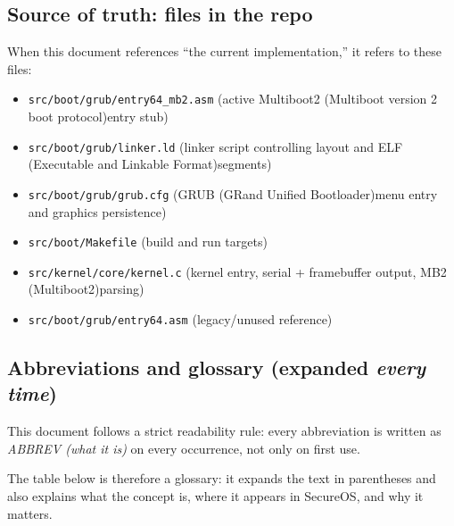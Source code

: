 \documentclass[11pt]{article}
\newcommand{\ELF}{ELF (Executable and Linkable Format)}
\newcommand{\GRUB}{GRUB (GRand Unified Bootloader)}
\newcommand{\MBtwo}{Multiboot2 (Multiboot version 2 boot protocol)}
\newcommand{\MBtwoShort}{MB2 (Multiboot2)}
\begin{document}
\subsection{Source of truth: files in the repo}
When this document references ``the current implementation,'' it refers to these files:
\begin{itemize}
  \item \texttt{src/boot/grub/entry64\_mb2.asm} (active \MBtwo entry stub)
  \item \texttt{src/boot/grub/linker.ld} (linker script controlling layout and \ELF segments)
  \item \texttt{src/boot/grub/grub.cfg} (\GRUB menu entry and graphics persistence)
  \item \texttt{src/boot/Makefile} (build and run targets)
  \item \texttt{src/kernel/core/kernel.c} (kernel entry, serial + framebuffer output, \MBtwoShort parsing)
  \item \texttt{src/boot/grub/entry64.asm} (legacy/unused reference)
\end{itemize}

\subsection{Abbreviations and glossary (expanded \emph{every time})}
This document follows a strict readability rule: every abbreviation is written as
\emph{ABBREV (what it is)} on every occurrence, not only on first use.

The table below is therefore a glossary: it expands the text in parentheses and also explains
what the concept is, where it appears in SecureOS, and why it matters.
\end{document}
